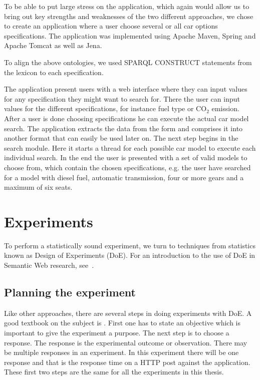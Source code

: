 \documentclass{llncs}
\begin{document}
To be able to put large stress on the application, which again would
allow us to bring out key strengths and weaknesses of the two
different approaches, we chose to create an application where a user
choose several or all car options specifications. The application was
implemented using Apache Maven, Spring and Apache Tomcat as well as
Jena.

To align the above ontologies, we used SPARQL CONSTRUCT statements
from the lexicon to each specification.

The application present users with a web interface where they can
input values for any specification they might want to search
for. There the user can input values for the different specifications,
for instance fuel type or CO$_2$ emission. After a user is done
choosing specifications he can execute the actual car model
search. The application extracts the data from the form and comprises
it into another format that can easily be used later on. The next step
begins in the search module. Here it starts a thread for each possible
car model to execute each individual search. In the end the user is
presented with a set of valid models to choose from, which contain the
chosen specifications, e.g. the user have searched for a model with
diesel fuel, automatic transmission, four or more gears and a maximum
of six seats.


\section{Experiments}\label{Results}

To perform a statistically sound experiment, we turn to techniques
from statistics known as Design of Experiments (DoE). For an
introduction to the use of DoE in Semantic Web research, see~\cite{Kjern}.

\subsection{Planning the experiment}
Like other approaches, there are several steps in doing experiments
with DoE. A good textbook on the subject is \cite{PlanExp}. First one
has to state an objective which is important to give the experiment a
purpose.  The next step is to choose a response. The response is the
experimental outcome or observation. There may be multiple responses
in an experiment. In this experiment there will be one response and
that is the response time on a HTTP post against the application.
These first two steps are the same for all the experiments in this
thesis.
\end{document}
